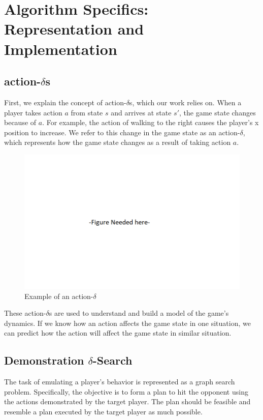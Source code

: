 
\chapter{Algorithm Specifics: Representation and Implementation}

\label{Chapter4} %

\section{action-$\delta$s}
First, we explain the concept of action-$\delta$s, which our work relies on. When a player takes action $a$ from state $s$ and arrives at state $s'$, the game state changes because of $a$. For example, the action of walking to the right causes the player's x position to increase. We refer to this change in the game state as an action-$\delta$, which represents how the game state changes as a result of taking action $a$. 

\begin{figure}[t]
	\centering
	\includegraphics[width=\textwidth]{Figures/Placeholder.png}
	\caption{Example of an action-$\delta$}
	\label{}
\end{figure}

These action-$\delta$s are used to understand and build a model of the game's dynamics. If we know how an action affects the game state in one situation, we can predict how the action will affect the game state in similar situation. 

\section{Demonstration $\delta$-Search}
The task of emulating a player's behavior is represented as a graph search problem. Specifically, the objective is to form a plan to hit the opponent using the actions demonstrated by the target player. The plan should be feasible and resemble a plan executed by the target player as much possible.

